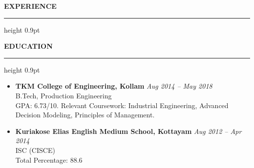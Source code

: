 \documentclass[11pt,letterpaper]{article}
\newenvironment{sectionheader}[1]{
    \vspace{6pt}\noindent\textbf{\uppercase{#1}}\vspace{1pt}\\[-2pt]
    \hrule height 0.9pt \vspace{3pt}
    \begin{itemize}[leftmargin=1.05em,itemsep=1pt,topsep=0pt]
}{
    \end{itemize}
}
\newenvironment{FitOnePage}
{%
  \newsavebox{\resumecontent}%
  \begin{lrbox}{\resumecontent}%
  \begin{minipage}{\textwidth}%
}
{%
  \end{minipage}%
  \end{lrbox}%
  \ifdim\ht\resumecontent>\textheight
    \begin{center}
      \adjustbox{max totalsize={\textwidth}{\textheight},center}{\usebox{\resumecontent}}
    \end{center}
  \else
    \usebox{\resumecontent}%
  \fi
}
\begin{document}
\begin{FitOnePage}
\begin{sectionheader}{Experience}
\end{sectionheader}\begin{sectionheader}{Education}
  \item \textbf{ TKM College of Engineering, Kollam } \hfill {\emph{ Aug 2014 -- May 2018 }} \\
        B.Tech, Production Engineering \\[-2pt]
        {\footnotesize GPA: 6.73/10. Relevant Coursework: Industrial Engineering, Advanced Decision Modeling, Principles of Management.}
  \item \textbf{ Kuriakose Elias English Medium School, Kottayam } \hfill {\emph{ Aug 2012 -- Apr 2014 }} \\
        ISC (CISCE) \\[-2pt]
        {\footnotesize Total Percentage: 88.6}
\end{sectionheader}\end{FitOnePage}
\end{document}
